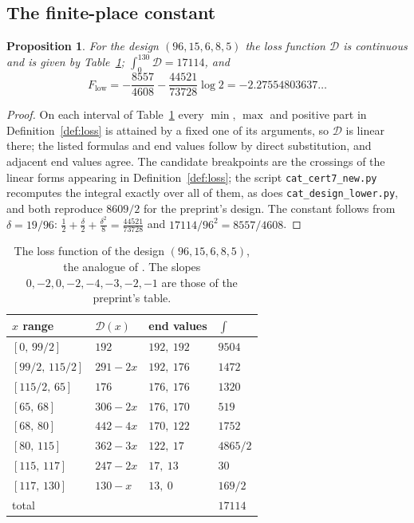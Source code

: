 \documentclass[11pt]{article}
\newtheorem{proposition}[theorem]{Proposition}
\theoremstyle{definition}
\newcommand{\Dl}{\mathcal{D}}
\begin{document}
\subsection{The finite-place constant}

\begin{proposition}\label{prop:flow96}
For the design $(96,15,6,8,5)$ the loss function $\Dl$ is continuous and is given by Table~\ref{tab:loss}; $\int_0^{130}\Dl=17114$, and
\[
F_{\mathrm{low}}=-\frac{8557}{4608}-\frac{44521}{73728}\log2=-2.27554803637\ldots
\]
\end{proposition}

\begin{proof}
On each interval of Table~\ref{tab:loss} every $\min$, $\max$ and positive part in Definition~\ref{def:loss} is attained by a fixed one of its arguments, so $\Dl$ is linear there; the listed formulas and end values follow by direct substitution, and adjacent end values agree. The candidate breakpoints are the crossings of the linear forms appearing in Definition~\ref{def:loss}; the script \texttt{cat\_cert7\_new.py} recomputes the integral exactly over all of them, as does \texttt{cat\_design\_lower.py}, and both reproduce $8609/2$ for the preprint's design. The constant follows from $\delta=19/96$: $\frac12+\frac\delta2+\frac{\delta^2}8=\frac{44521}{73728}$ and $17114/96^2=8557/4608$.
\end{proof}

\begin{table}[ht]
\centering
\begin{tabular}{llll}
\toprule
$x$ range & $\Dl(x)$ & end values & $\int$ \\
\midrule
$[0,\,99/2]$ & $192$ & $192,\ 192$ & $9504$\\
$[99/2,\,115/2]$ & $291-2x$ & $192,\ 176$ & $1472$\\
$[115/2,\,65]$ & $176$ & $176,\ 176$ & $1320$\\
$[65,\,68]$ & $306-2x$ & $176,\ 170$ & $519$\\
$[68,\,80]$ & $442-4x$ & $170,\ 122$ & $1752$\\
$[80,\,115]$ & $362-3x$ & $122,\ 17$ & $4865/2$\\
$[115,\,117]$ & $247-2x$ & $17,\ 13$ & $30$\\
$[117,\,130]$ & $130-x$ & $13,\ 0$ & $169/2$\\
\midrule
total & & & $17114$\\
\bottomrule
\end{tabular}
\caption{The loss function of the design $(96,15,6,8,5)$, the analogue of \cite[Table~(43)]{OAI}. The slopes $0,-2,0,-2,-4,-3,-2,-1$ are those of the preprint's table.}\label{tab:loss}
\end{table}
\end{document}
